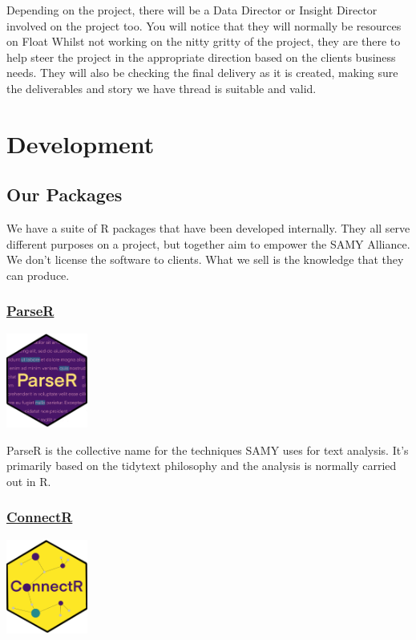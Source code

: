 \documentclass[
  letterpaper,
  DIV=11,
  numbers=noendperiod]{scrreprt}
\begin{document}
Depending on the project, there will be a Data Director or Insight
Director involved on the project too. You will notice that they will
normally be resources on Float Whilst not working on the nitty gritty of
the project, they are there to help steer the project in the appropriate
direction based on the clients business needs. They will also be
checking the final delivery as it is created, making sure the
deliverables and story we have thread is suitable and valid.

\part{Development}

\chapter{Our Packages}\label{our-packages}

We have a suite of R packages that have been developed internally. They
all serve different purposes on a project, but together aim to empower
the SAMY Alliance. We don't license the software to clients. What we
sell is the knowledge that they can produce.

\section{\texorpdfstring{\href{https://parser.shareldn.com/index.html}{ParseR}}{ParseR}}\label{parser}

\includegraphics[width=0.2\textwidth,height=\textheight]{./img/hex/parser.png}

ParseR is the collective name for the techniques SAMY uses for text
analysis. It's primarily based on the tidytext philosophy and the
analysis is normally carried out in R.

\section{\texorpdfstring{\href{https://avery-island.github.io/ConnectR/index.html}{ConnectR}}{ConnectR}}\label{connectr}

\includegraphics[width=0.2\textwidth,height=\textheight]{./img/hex/connectr.png}
\end{document}
